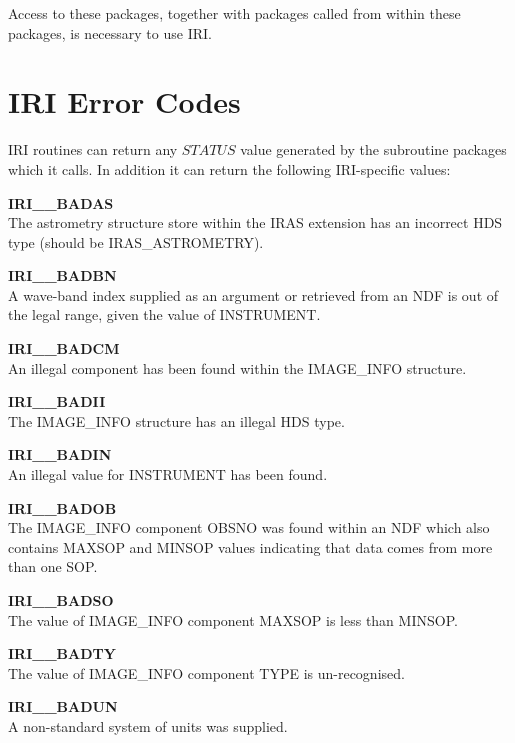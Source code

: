 Access to these packages, together with packages called from within these 
packages, is necessary to use IRI. 

\section{IRI Error Codes}
\label {APP:ERRORS}
IRI routines can return any $STATUS$ value generated by the subroutine packages 
which it calls. In addition it can return the following IRI-specific values:

\begin{description}

\item {\bf IRI\_\_BADAS}\\
The astrometry structure store within the IRAS extension has an incorrect
HDS type (should be IRAS\_ASTROMETRY).

\item {\bf IRI\_\_BADBN}\\
A wave-band index supplied as an argument or retrieved from an NDF is out of 
the legal range, given the value of INSTRUMENT.

\item {\bf IRI\_\_BADCM}\\
An illegal component has been found within the IMAGE\_INFO structure.

\item {\bf IRI\_\_BADII}\\
The IMAGE\_INFO structure has an illegal HDS type.

\item {\bf IRI\_\_BADIN}\\
An illegal value for INSTRUMENT has been found.

\item {\bf IRI\_\_BADOB}\\
The IMAGE\_INFO component OBSNO was found within an NDF which also contains
MAXSOP and MINSOP values indicating that data comes from more than one SOP.

\item {\bf IRI\_\_BADSO}\\
The value of IMAGE\_INFO component MAXSOP is less than MINSOP.

\item {\bf IRI\_\_BADTY}\\
The value of IMAGE\_INFO component TYPE is un-recognised.

\item {\bf IRI\_\_BADUN}\\
A non-standard system of units was supplied.


\end{description}
